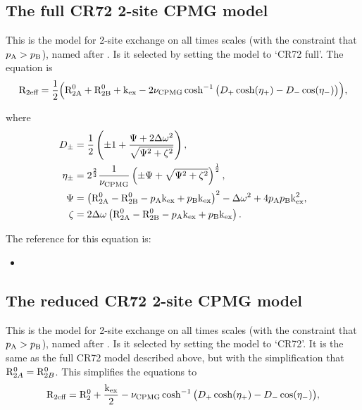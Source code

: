 
\subsection{The full CR72 2-site CPMG model}
\label{sect: dispersion: CR72 full model}

This is the model for 2-site exchange on all times scales (with the constraint that $p_\textrm{A} > p_\textrm{B}$), named after \citet{CarverRichards72}.
Is it selected by setting the model to `CR72 full'.
The equation is
\begin{equation}
    \mathrm{R}_{2\textrm{eff}} = \frac{1}{2} \Big( \textrm{R}_\textrm{2A}^0 + \textrm{R}_\textrm{2B}^0 + \textrm{k}_\textrm{ex} - 2\nu_\textrm{CPMG}\cosh^{-1} \big( D_+\cosh(\eta_+) - D_-\cos(\eta_-) \big) \Big) ,
\end{equation}

where
\begin{align}
    D_\pm    &= \frac{1}{2} \left( \pm1 + \frac{\Psi + 2\Delta\omega^2}{\sqrt{\Psi^2 + \zeta^2}} \right) , \\
    \eta_\pm &= 2^{\frac{2}{3}}\frac{1}{\nu_\textrm{CPMG}} \left( \pm\Psi + \sqrt{\Psi^2 + \zeta^2} \right)^{\frac{1}{2}} , \\
    \Psi     &= \left( \textrm{R}_\textrm{2A}^0 - \textrm{R}_\textrm{2B}^0 - p_\textrm{A}\textrm{k}_\textrm{ex} + p_\textrm{B}\textrm{k}_\textrm{ex} \right)^2 - \Delta\omega^2 + 4p_\textrm{A}p_\textrm{B}\textrm{k}_\textrm{ex}^2 , \\
    \zeta    &= 2\Delta\omega \left( \textrm{R}_\textrm{2A}^0 - \textrm{R}_\textrm{2B}^0 - p_\textrm{A}\textrm{k}_\textrm{ex} + p_\textrm{B}\textrm{k}_\textrm{ex} \right).
\end{align}

The reference for this equation is:
\begin{itemize}
\item {}
\end{itemize}




\subsection{The reduced CR72 2-site CPMG model}
\label{sect: dispersion: CR72 model}

This is the model for 2-site exchange on all times scales (with the constraint that $p_\textrm{A} > p_\textrm{B}$), named after \citet{CarverRichards72}.
Is it selected by setting the model to `CR72'.
It is the same as the full CR72 model described above, but with the simplification that $\mathrm{R}_{2A}^0 = \mathrm{R}_{2B}^0$.
This simplifies the equations to
\begin{equation}
    \mathrm{R}_{2\textrm{eff}} = \mathrm{R}_2^0 + \frac{\textrm{k}_\textrm{ex}}{2} - \nu_\textrm{CPMG}\cosh^{-1} \big( D_+\cosh(\eta_+) - D_-\cos(\eta_-) \big) ,
\end{equation}

